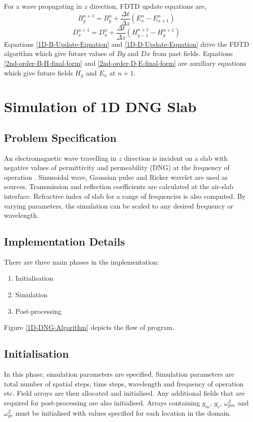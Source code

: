 For a wave propagating in $z$ direction, FDTD update equations are,
\begin{equation}
B^{n+1}_y=B^n_y+\dfrac{\Delta t}{\Delta z}\left(E^n_x-E^n_{x+1}\right)
\label{1D-B-Update-Equation}
\end{equation}
\begin{equation}
D^{n+1}_x=D^n_x+\dfrac{\Delta t}{\Delta z}\left(H^{n+1}_{y-1}-H^{n+1}_y\right)
\label{1D-D-Update-Equation}
\end{equation}
Equations \ref{1D-B-Update-Equation} and \ref{1D-D-Update-Equation} drive the FDTD algorithm which give future values of $By$ and $Dx$ from past fields. Equations \ref{2nd-order-B-H-final-form} and \ref{2nd-order-D-E-final-form} are auxiliary equations which give future fields $H_y$ and $E_x$ at $n+1$.
\section{Simulation of 1D DNG Slab}
\subsection{Problem Specification}
An electromagnetic wave travelling in $z$ direction is incident on a slab with negative values of permittivity and permeability (DNG) at the frequency of operation \cite{DNG-Ehud-Ziol}. Sinusoidal wave, Gaussian pulse and Ricker wavelet are used as sources. Transmission and reflection coefficients are calculated at the air-slab interface. Refractive index of slab for a range of frequencies is also computed. By varying parameters, the simulation can be scaled to any desired frequency or wavelength.
\subsection{Implementation Details}
There are three main phases in the implementation:
\begin{enumerate}
\item Initialisation
\item Simulation
\item Post-processing
\end{enumerate}
Figure \ref{1D-DNG-Algorithm} depicts the flow of program.
\subsection{Initialisation}
In this phase, simulation parameters are specified. Simulation parameters are total number of spatial steps, time steps, wavelength and frequency of operation etc. Field arrays are then allocated and initialised. Any additional fields that are required for post-processing are also initialised. Arrays containing $g_m$, $g_e$, $\omega^2_{pm}$ and $\omega^2_{pe}$ must be initialised with values specified for each location in the domain.
